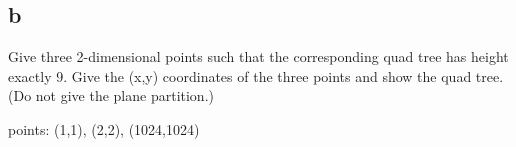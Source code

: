\documentclass[12pt]{article}
\begin{document}
\begin{enumerate}
\part{b} Give three 2-dimensional points such that the corresponding
quad tree has height exactly 9.  Give the (x,y) coordinates of the
three points and show the quad tree.  (Do not give the plane
partition.)

points: (1,1), (2,2), (1024,1024)




\end{enumerate}

\end{document}
